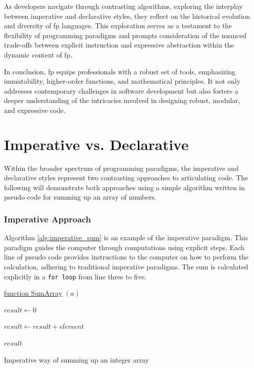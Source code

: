    As developers navigate through contrasting algorithms, exploring the interplay between imperative and declarative styles, they reflect on the historical evolution and diversity of \ac{fp} languages. This exploration serves as a testament to the flexibility of programming paradigms and prompts consideration of the nuanced trade-offs between explicit instruction and expressive abstraction within the dynamic context of \ac{fp}.
    
    In conclusion, \ac{fp} equips professionals with a robust set of tools, emphasizing immutability, higher-order functions, and mathematical principles. It not only addresses contemporary challenges in software development but also fosters a deeper understanding of the intricacies involved in designing robust, modular, and expressive code.
    

\section*{Imperative vs. Declarative}

Within the broader spectrum of programming paradigms, the imperative and declarative styles represent two contrasting approaches to articulating code. The following will demonstrate both approaches using a simple algorithm written in pseudo code for summing up an array of numbers.

\subsubsection{Imperative Approach}

Algorithm \ref{alg:imperative_sum} is an example of the imperative paradigm. This paradigm guides the computer through computations using explicit steps. Each line of pseudo code provides instructions to the computer on how to perform the calculation, adhering to traditional imperative paradigms. The sum is calculated explicitly in a \texttt{for loop} from line three to five.

\begin{algorithm}

    \underline{function SumArray} $(a)$\;
    
    \BlankLine
    $result \leftarrow 0$
    
    {
        $result \leftarrow result + element$
    }
    
    \Return $result$
    
    \caption{Imperative way of summing up an integer array}
    \label{alg:imperative_sum}
\end{algorithm}

